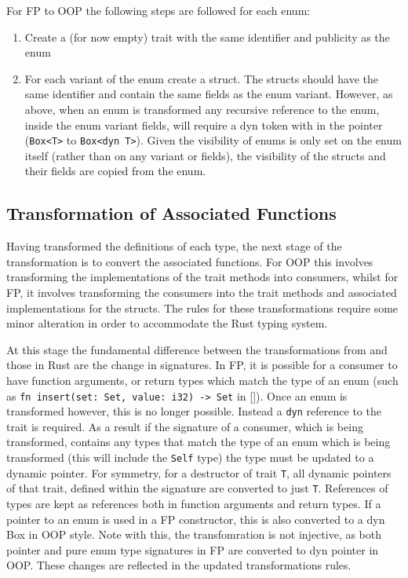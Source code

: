 \documentclass[ oneside,%
                    author={James Elgar},
                    degree={MEng},
                     title={Bidirectional transformer between functional and \\ object-oriented programming in Rust},
                  subtitle={}]{dissertation}
\newcommand{\rust}[1]{\texttt{#1}}
\begin{document}
For FP to OOP the following steps are followed for each enum:
\begin{enumerate}
    \item Create a (for now empty) trait with the same identifier and publicity as the enum  
    \item For each variant of the enum create a struct. The structs should have the same identifier and contain the same fields as the enum variant.
    However, as above, when an enum is transformed any recursive reference to the enum, inside the enum variant fields, will require a dyn token with in the pointer (\rust{Box<T>} to \rust{Box<dyn T>}). Given the visibility of enums is only set on the enum itself (rather than on any variant or fields), the visibility of the structs and their fields are copied from the enum.
\end{enumerate}

\subsection{Transformation of Associated Functions}

Having transformed the definitions of each type, the next stage of the transformation is to convert the associated functions. For OOP this involves transforming the implementations of the trait methods into consumers, whilst for FP, it involves transforming the consumers into the trait methods and associated implementations for the structs. The rules for these transformations require some minor alteration in order to accommodate the Rust typing system.

At this stage the fundamental difference between the transformations from \cite{food} and those in Rust are the change in signatures. In FP, it is possible for a consumer to have function arguments, or return types which match the type of an enum (such as \rust{fn insert(set: Set, value: i32) -> Set} in \autoref{}). Once an enum is transformed however, this is no longer possible. Instead a \rust{dyn} reference to the trait is required. As a result if the signature of a consumer, which is being transformed, contains any types that match the type of an enum which is being transformed (this will include the \rust{Self} type) the type must be updated to a dynamic pointer. For symmetry, for a destructor of trait \rust{T}, all dynamic pointers of that trait, defined within the signature are converted to just \rust{T}. References of types are kept as references both in function arguments and return types. If a pointer to an enum is used in a FP constructor, this is also converted to a dyn Box in OOP style. Note with this, the transfomration is not injective, as both pointer and pure enum type signatures in FP are converted to dyn pointer in OOP. These changes are reflected in the updated transformations rules.
\end{document}
